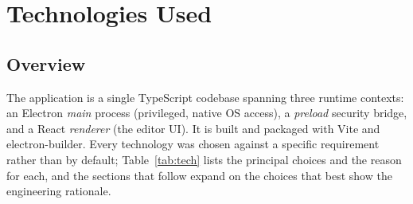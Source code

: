 
\chapter{Technologies Used}
\label{ch:tech}

\section{Overview}
The application is a single TypeScript codebase spanning three runtime contexts:
an Electron \emph{main} process (privileged, native OS access), a \emph{preload}
security bridge, and a React \emph{renderer} (the editor UI). It is built and
packaged with Vite and electron-builder. Every technology was chosen against a
specific requirement rather than by default; Table~\ref{tab:tech} lists the
principal choices and the reason for each, and the sections that follow expand on
the choices that best show the engineering rationale.

